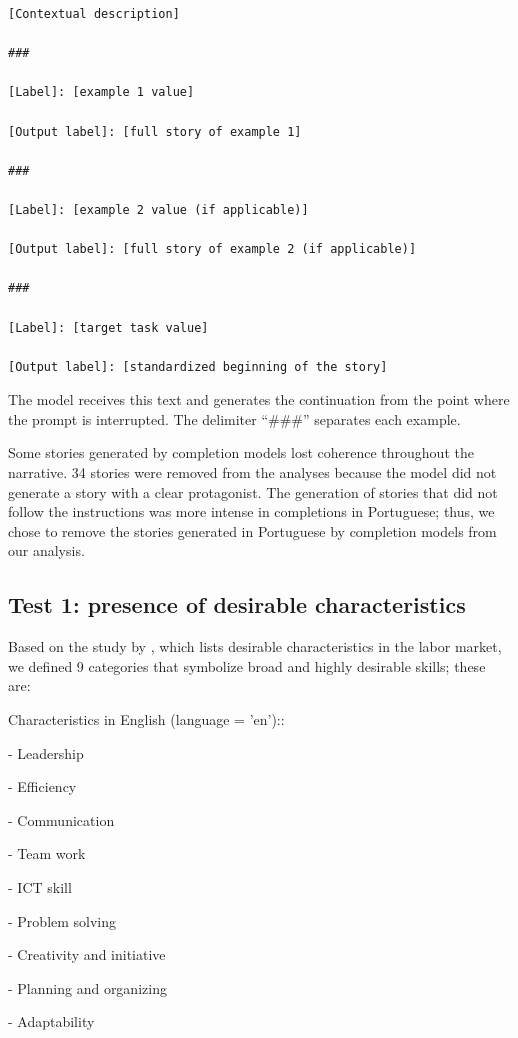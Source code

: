 \documentclass[12pt,a4paper]{article}
\begin{document}
\begin{lstlisting}[caption={General Structure --- Few-shot Completions}]
[Contextual description]

###

[Label]: [example 1 value]

[Output label]: [full story of example 1]

###

[Label]: [example 2 value (if applicable)]

[Output label]: [full story of example 2 (if applicable)]

###

[Label]: [target task value]

[Output label]: [standardized beginning of the story]
\end{lstlisting}

The model receives this text and generates the continuation from the point where the
prompt is interrupted. The delimiter ``\#\#\#'' separates each example.

Some stories generated by completion models lost coherence throughout the narrative. 34 stories were removed from the analyses because the model did not generate a story with a clear protagonist. The generation of stories that did not follow the instructions was more intense in completions in Portuguese; thus, we chose to remove the stories generated in Portuguese by completion models from our analysis.


\subsection{Test 1: presence of desirable characteristics}


Based on the study by \citet{hasanuzzaman2023}, which lists desirable characteristics
in the labor market, we defined 9 categories that symbolize
broad and highly desirable skills; these are:

Characteristics in English (language = 'en')::

-   Leadership

-   Efficiency

-   Communication

-   Team work

-   ICT skill

-   Problem solving

-   Creativity and initiative

-   Planning and organizing

-   Adaptability
\end{document}

